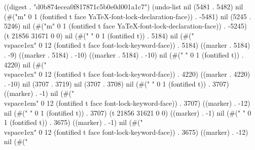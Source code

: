 
((digest . "d0b874ecea0f817871c5b0e0d001a1c7") (undo-list nil (5481 . 5482) nil (#("m" 0 1 (fontified t face YaTeX-font-lock-declaration-face)) . -5481) nil (5245 . 5246) nil (#("m" 0 1 (fontified t face YaTeX-font-lock-declaration-face)) . -5245) (t 21856 31671 0 0) nil (#("
" 0 1 (fontified t)) . 5184) nil (#("\\vspace{1ex}" 0 12 (fontified t face font-lock-keyword-face)) . 5184) ((marker . 5184) . -9) ((marker . 5184) . -10) ((marker . 5184) . -10) nil (#("
" 0 1 (fontified t)) . 4220) nil (#("\\vspace{1ex}" 0 12 (fontified t face font-lock-keyword-face)) . 4220) ((marker . 4220) . -10) nil (3707 . 3719) nil (3707 . 3708) nil (#("
" 0 1 (fontified t)) . 3707) ((marker) . -1) nil (#("\\vspace{1em}" 0 12 (fontified t face font-lock-keyword-face)) . 3707) ((marker) . -12) nil (#("
" 0 1 (fontified t)) . 3707) (t 21856 31621 0 0) ((marker) . -1) nil (#("
" 0 1 (fontified t)) . 3675) ((marker) . -1) nil (#("\\vspace{1ex}" 0 12 (fontified t face font-lock-keyword-face)) . 3675) ((marker) . -12) nil (#("
